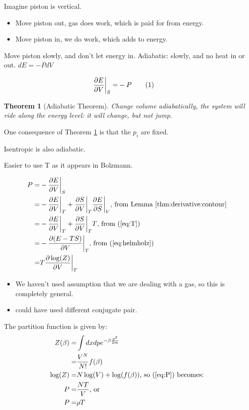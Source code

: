 \documentclass[]{article}
\newcommand\numberthis{\addtocounter{equation}{1}\tag{\theequation}}
\newtheorem{thm}{Theorem}
\begin{document}
Imagine piston is vertical.
\begin{itemize}
	\item Move piston out, gas does work, which is paid for from energy.
	\item Move piston in, we do work, which adds to energy.
\end{itemize}

Move piston slowly, and don't let energy in. Adiabatic: slowly, and no heat in or out. $dE = - P dV$

\begin{align*}
\frac{\partial E}{\partial V}\bigg|_S =& - P\numberthis \label{eq:defP}
\end{align*}


\begin{thm}[Adiabatic Theorem]\label{thm:adiabatic}
	Change volume adiabatically, the system will ride along the energy level: it will change, but not jump.
\end{thm}

One consequence of Theorem \ref{thm:adiabatic} is that the $p_i$ are fixed.

Isentropic is also adiabatic.

Easier to use T as it appears in Bolzmann.

\begin{align*}
P =& - \frac{\partial E}{\partial V}\bigg|_S \\
=& - \frac{\partial E}{\partial V}\bigg|_T + \frac{\partial S}{\partial V}\bigg|_T \frac{\partial E}{\partial S}\bigg|_V\text{, from Lemma \ref{thm:derivative:contour}}\\
=& - \frac{\partial E}{\partial V}\bigg|_T + \frac{\partial S}{\partial V}\bigg|_T T\text{, from (\ref{eq:T})}\\
=& - \frac{\partial(E-TS)}{\partial V}\bigg|_T \text{, from (\ref{eq:helmholz})}\\
=& T \frac{\partial \log(Z)}{\partial V}\bigg|_T 
\end{align*}

\begin{itemize}
	\item We haven't used assumption that we are dealing with a gas, so this is completely general.
	\item could have used different conjugate pair.
\end{itemize}

The partition function is given by:
\begin{align*}
Z(\beta) =& \int dx dp e^{- \beta \frac{p^2}{2m}}\\
=& \frac{V^N}{N!} f(\beta)\\
\log(Z) =& N \log(V) + \log(f(\beta))\text{, so (\ref{eq:P})  becomes:}\\
P =& \frac{NT}{V}\text{, or}\\
P =& \rho T
\end{align*}
\end{document}
